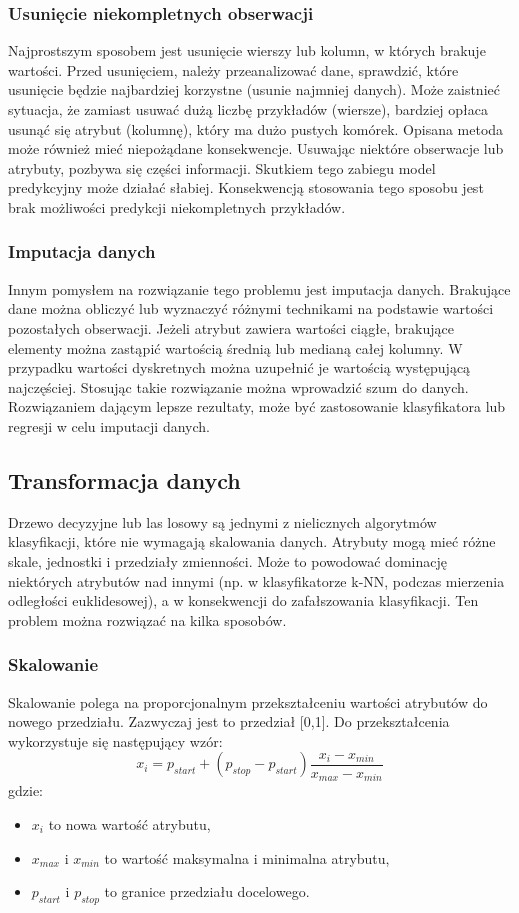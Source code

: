 \subsubsection{Usunięcie niekompletnych obserwacji}
Najprostszym sposobem jest usunięcie wierszy lub kolumn, w których brakuje wartości. Przed usunięciem, należy przeanalizować dane, sprawdzić, które usunięcie będzie najbardziej korzystne (usunie najmniej danych). Może zaistnieć sytuacja, że zamiast usuwać dużą liczbę przykładów (wiersze), bardziej opłaca usunąć się atrybut (kolumnę), który ma dużo pustych komórek. Opisana metoda może również mieć niepożądane konsekwencje. Usuwając niektóre obserwacje lub atrybuty, pozbywa się części informacji. Skutkiem tego zabiegu model predykcyjny może działać słabiej. Konsekwencją stosowania tego sposobu jest brak możliwości predykcji niekompletnych przykładów.
\subsubsection{Imputacja danych}
Innym pomysłem na rozwiązanie tego problemu jest imputacja danych. Brakujące dane można obliczyć lub wyznaczyć różnymi technikami na podstawie wartości pozostałych obserwacji. Jeżeli atrybut zawiera wartości ciągłe, brakujące elementy można zastąpić wartością średnią lub medianą całej kolumny. W przypadku wartości dyskretnych można uzupełnić je wartością występującą najczęściej. Stosując takie rozwiązanie można wprowadzić szum do danych. Rozwiązaniem dającym lepsze rezultaty, może być zastosowanie klasyfikatora lub regresji w celu imputacji danych.
\subsection{Transformacja danych}
Drzewo decyzyjne lub las losowy są jednymi z nielicznych algorytmów klasyfikacji, które nie wymagają skalowania danych. Atrybuty mogą mieć różne skale, jednostki i przedziały zmienności. Może to powodować dominację niektórych atrybutów nad innymi (np. w klasyfikatorze k-NN, podczas mierzenia odległości euklidesowej), a w konsekwencji do zafałszowania klasyfikacji. Ten problem można rozwiązać na kilka sposobów.
\subsubsection{Skalowanie}
Skalowanie polega na proporcjonalnym przekształceniu wartości atrybutów do nowego przedziału. Zazwyczaj jest to przedział [0,1]. Do przekształcenia wykorzystuje się następujący wzór:
\[x_i=p_{start}+(p_{stop}-p_{start})\frac{x_i-x_{min}}{x_{max}-x_{min}}\]
gdzie:
\begin{itemize}
	\item $x_i$ to nowa wartość atrybutu,
	\item $x_{max}$ i $x_{min}$ to wartość maksymalna i minimalna atrybutu,
	\item $p_{start}$ i $p_{stop}$ to granice przedziału docelowego.
\end{itemize}
